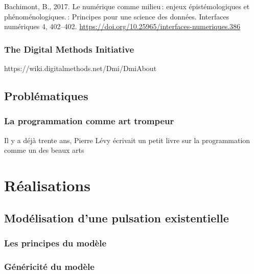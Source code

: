 \documentclass[
  letterpaper,
  DIV=11,
  numbers=noendperiod]{scrreprt}
\begin{document}
Bachimont, B., 2017. Le numérique comme milieu\,: enjeux
épistémologiques et phénoménologiques.\,: Principes pour une science des
données. Interfaces numériques 4, 402--402.
\url{https://doi.org/10.25965/interfaces-numeriques.386}

\hypertarget{the-digital-methods-initiative}{%
\subsection{The Digital Methods
Initiative}\label{the-digital-methods-initiative}}

https://wiki.digitalmethods.net/Dmi/DmiAbout

\hypertarget{probluxe9matiques}{%
\section{Problématiques}\label{probluxe9matiques}}

\hypertarget{la-programmation-comme-art-trompeur}{%
\subsection{La programmation comme art
trompeur}\label{la-programmation-comme-art-trompeur}}

Il y a déjà trente ans, Pierre Lévy écrivait un petit livre sur la
programmation comme un des beaux arts

\hypertarget{sec-realisations}{%
\chapter{Réalisations}\label{sec-realisations}}

\hypertarget{moduxe9lisation-dune-pulsation-existentielle}{%
\section{Modélisation d'une pulsation
existentielle}\label{moduxe9lisation-dune-pulsation-existentielle}}

\hypertarget{les-principes-du-moduxe8le}{%
\subsection{Les principes du modèle}\label{les-principes-du-moduxe8le}}

\hypertarget{guxe9nuxe9ricituxe9-du-moduxe8le}{%
\subsection{Généricité du
modèle}\label{guxe9nuxe9ricituxe9-du-moduxe8le}}
\end{document}

